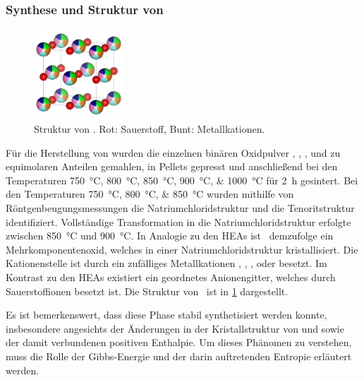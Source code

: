 \subsubsection{Synthese und Struktur von \heo}\label{subsubsec:heo}
\begin{figure}
    \centering
    \includegraphics[width=0.3\textwidth]{../assets/theorie/heo}
    \caption{Struktur von \heo. Rot: Sauerstoff, Bunt: Metallkationen.}
    \label{fig:heo}
\end{figure}
Für die Herstellung von \heo wurden die einzelnen binären Oxidpulver , , ,  und 
zu equimolaren Anteilen gemahlen, in Pellets gepresst und anschließend bei den Temperaturen
\qtylist{750;800;850;900;1000}{\celsius} für \qty{2}{\hour} gesintert.
Bei den Temperaturen \qtylist{750;800;850}{\celsius} wurden mithilfe von Röntgenbeugungsmessungen die
Natriumchloridstruktur und die Tenoritstruktur identifiziert.
Vollständige Transformation in die Natriumchloridstruktur erfolgte zwischen \qty{850}{\celsius} und \qty{900}{\celsius}.
In Analogie zu den HEAs ist \heo\ demzufolge ein Mehrkomponentenoxid, welches in einer Natriumchloridstruktur
kristallisiert.
Die Kationenstelle ist durch ein zufälliges Metallkationen , , ,
 oder  besetzt.
Im Kontrast zu den HEAs existiert ein geordnetes Anionengitter, welches durch Sauerstoffionen besetzt ist.
Die Struktur von \heo\ ist in \cref{fig:heo} dargestellt.\autocite[5]{Rost2015}

Es ist bemerkenswert, dass diese Phase stabil synthetisiert werden konnte, insbesondere angesichts der Änderungen in der
Kristallstruktur von  und  sowie der damit verbundenen positiven Enthalpie.
Um dieses Phänomen zu verstehen, muss die Rolle der Gibbs-Energie und der darin auftretenden Entropie
erläutert werden.

